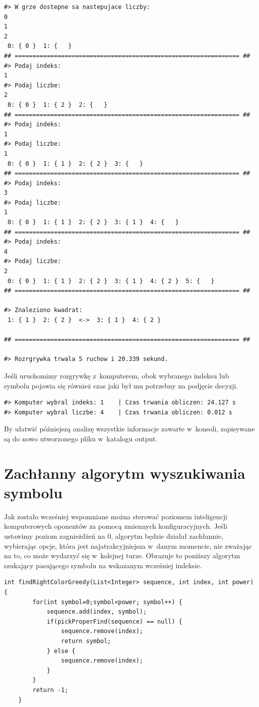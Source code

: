 \documentclass[document]{xmgr}
\begin{document}
\begin{lstlisting}[frame=single]
#> W grze dostepne sa nastepujace liczby: 
0
1
2
 0: { 0 }  1: {   } 
## =============================================================== ##
#> Podaj indeks: 
1
#> Podaj liczbe: 
2
 0: { 0 }  1: { 2 }  2: {   } 
## =============================================================== ##
#> Podaj indeks: 
1
#> Podaj liczbe: 
1
 0: { 0 }  1: { 1 }  2: { 2 }  3: {   } 
## =============================================================== ##
#> Podaj indeks: 
3
#> Podaj liczbe: 
1
 0: { 0 }  1: { 1 }  2: { 2 }  3: { 1 }  4: {   } 
## =============================================================== ##
#> Podaj indeks: 
4
#> Podaj liczbe: 
2
 0: { 0 }  1: { 1 }  2: { 2 }  3: { 1 }  4: { 2 }  5: {   } 
## =============================================================== ##

#> Znaleziono kwadrat:  
 1: { 1 }  2: { 2 }  <->  3: { 1 }  4: { 2 } 

## =============================================================== ##

#> Rozrgrywka trwala 5 ruchow i 20.339 sekund.
\end{lstlisting}
Jeśli uruchomimy rozgrywkę z~komputerem, obok wybranego indeksu lub symbolu pojawia się również czas jaki był mu potrzebny na podjęcie decyzji.

\begin{lstlisting}[frame=single]
#> Komputer wybral indeks: 1 	| Czas trwania obliczen: 24.127 s
#> Komputer wybral liczbe: 4 	| Czas trwania obliczen: 0.012 s\end{lstlisting}

By ułatwić późniejszą analizę wszystkie informacje zawarte w~konsoli, zapisywane są do nowo utworzonego pliku w~katalogu output.

\section{Zachłanny algorytm wyszukiwania symbolu}
Jak zostało wcześniej wspomniane można sterować poziomem inteligencji komputerowych oponentów za pomocą zmiennych konfiguracyjnych. Jeśli ustawimy poziom zagnieżdżeń na 0, algorytm będzie działał zachłannie, wybierając opcje, która jest najatrakcyjniejsza w~danym momencie, nie zważając na to, co może wydarzyć się w~kolejnej turze. Obrazuje to poniższy algorytm szukający pasującego symbolu na wskazanym wcześniej indeksie.

\begin{lstlisting}[frame=single]
int findRightColorGreedy(List<Integer> sequence, int index, int power) {
		for(int symbol=0;symbol<power; symbol++) {
			sequence.add(index, symbol);
			if(pickProperFind(sequence) == null) {
				sequence.remove(index);
				return symbol;
			} else {
				sequence.remove(index);
			}
		}
		return -1;
	}
\end{lstlisting}
\end{document}
